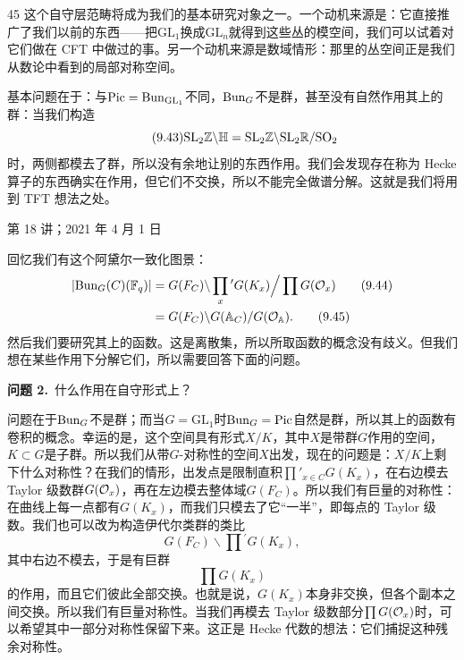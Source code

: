 \begin{srcrem}{45}
这个自守层范畴将成为我们的基本研究对象之一。一个动机来源是：它直接推广了我们以前的东西——把$\mathrm{GL}_1$换成$\mathrm{GL}_n$就得到这些丛的模空间，我们可以试着对它们做在 CFT 中做过的事。另一个动机来源是数域情形：那里的丛空间正是我们从数论中看到的局部对称空间。
\end{srcrem}

基本问题在于：与$\mathrm{Pic}=\mathrm{Bun}_{\mathrm{GL}_1}$不同，$\mathrm{Bun}_G$不是群，甚至没有自然作用其上的群：当我们构造
\begin{equation}\tag{9.43}
\mathrm{SL}_2\mathbb{Z}\backslash\mathbb H=\mathrm{SL}_2\mathbb{Z}\backslash\mathrm{SL}_2\mathbb{R}/\mathrm{SO}_2
\end{equation}
时，两侧都模去了群，所以没有余地让别的东西作用。我们会发现存在称为 Hecke 算子的东西确实在作用，但它们不交换，所以不能完全做谱分解。这就是我们将用到 TFT 想法之处。

\begin{flushright}\small 第 18 讲；2021 年 4 月 1 日\end{flushright}

回忆我们有这个阿黛尔一致化图景：
\begin{align}
|\mathrm{Bun}_G(C)(\mathbb{F}_q)|&=G(F_C)\backslash\prod_{x}{}^{\prime}G(K_x)\Big/\prod G(\mathcal{O}_x)\tag{9.44}\\
&=G(F_C)\backslash G(\mathbb{A}_C)/G(\mathcal{O}_{\mathbb{A}}).\tag{9.45}
\end{align}
然后我们要研究其上的函数。这是离散集，所以所取函数的概念没有歧义。但我们想在某些作用下分解它们，所以需要回答下面的问题。

\medskip
\noindent\textbf{问题 2.}\ 什么作用在自守形式上？

问题在于$\mathrm{Bun}_G$不是群；而当$G=\mathrm{GL}_1$时$\mathrm{Bun}_G=\mathrm{Pic}$自然是群，所以其上的函数有卷积的概念。幸运的是，这个空间具有形式$X/K$，其中$X$是带群$G$作用的空间，$K\subset G$是子群。所以我们从带$G$-对称性的空间$X$出发，现在的问题是：$X/K$上剩下什么对称性？在我们的情形，出发点是限制直积$\prod'_{x\in C}G(K_x)$，在右边模去 Taylor 级数群$G(\mathcal{O}_x)$，再在左边模去整体域$G(F_C)$。所以我们有巨量的对称性：在曲线上每一点都有$G(K_x)$，而我们只模去了它“一半”，即每点的 Taylor 级数。我们也可以改为构造伊代尔类群的类比
\begin{equation}\tag{9.46}
G(F_C)\backslash\prod{}^{\prime}G(K_x),
\end{equation}
其中右边不模去，于是有巨群
\begin{equation}\tag{9.47}
\prod G(K_x)
\end{equation}
的作用，而且它们彼此全部交换。也就是说，$G(K_x)$本身非交换，但各个副本之间交换。所以我们有巨量对称性。当我们再模去 Taylor 级数部分$\prod G(\mathcal{O}_x)$时，可以希望其中一部分对称性保留下来。这正是 Hecke 代数的想法：它们捕捉这种残余对称性。

